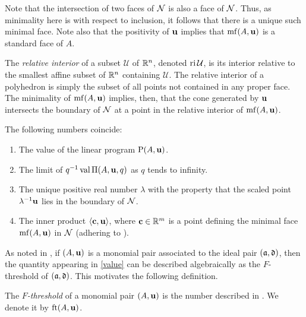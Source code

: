 \documentclass{amsart}
\begin{document}
Note that the intersection of two faces of $\mathcal{N}$ is also a face of $\mathcal{N}$.
Thus, as minimality here is with respect to inclusion, it follows that there is a unique such minimal face.
Note also that the positivity of $\mathbf{u}$ implies that $\operatorname{mf}(A,\mathbf{u})$ is a standard face of $A$.

The \emph{relative interior} of a subset $\mathcal{U}$ of $\mathbb{R}^n$, denoted $\operatorname{ri} \mathcal{U}$, is its interior relative to the smallest affine subset of $\mathbb{R}^n$ containing $\mathcal{U}$.
The relative interior of a polyhedron is simply the subset of all points not contained in any proper face.
The minimality of $\operatorname{mf}(A,\mathbf{u})$ implies, then, that the cone generated by $\mathbf{u}$ intersects the boundary of $\mathcal{N}$ at a point in the relative interior of $\operatorname{mf}(A,\mathbf{u})$.

\begin{proposition}
   \label{FT descriptions: P}
   The following numbers coincide\textup:
   \begin{enumerate}[$(1)$]
      \item\label{value} The value of the linear program $\mathrm{P}(A, \mathbf{u})$.
      \item\label{limit} The limit of $q^{-1}\operatorname{val} \Pi(A,\mathbf{u},q)$ as $q$ tends to infinity.
      \item\label{lambda} The unique positive real number $\lambda$ with the property that the scaled point $\lambda^{-1}\mathbf{u}$ lies in the boundary of $\mathcal{N}$.
      \item\label{new ip} The inner product $\langle \mathbf{c}, \mathbf{u} \rangle$, where $\mathbf{c} \in \mathbb{R}^m$ is a point defining the minimal face $\operatorname{mf}(A, \mathbf{u})$ in $\mathcal{N}$ \textup(adhering to \textup).
   \end{enumerate}
\end{proposition}

As noted in , if $(A,\mathbf{u})$ is a monomial pair associated to the ideal pair $(\mathfrak{a},\mathfrak{d})$, then the quantity appearing in \ref{value} can be described algebraically as the $F$-threshold of $(\mathfrak{a},\mathfrak{d})$.
This motivates the following definition.

\begin{definition}
\label{FT: D}
   The \emph{$F$-threshold} of a monomial pair $(A, \mathbf{u})$ is the number described in .  We denote it by $\operatorname{ft}(A, \mathbf{u})$.
\end{definition}
\end{document}
